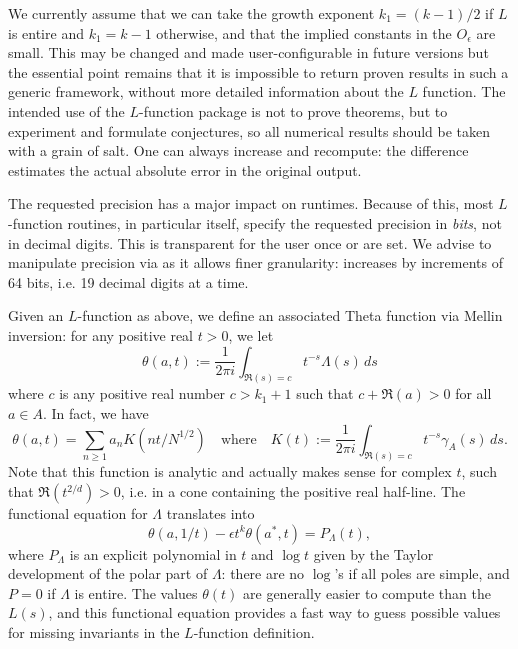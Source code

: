 We currently assume that we can take the growth exponent $k_1 = (k-1)/2$ if
$L$ is entire and $k_1 = k-1$ otherwise, and that the implied constants in
the $O_\epsilon$ are small. This may be changed and made user-configurable
in future versions but the essential point remains that it is impossible to
return proven results in such a generic framework, without more detailed
information about the $L$ function. The intended use of the $L$-function
package is not to prove theorems, but to experiment and formulate
conjectures, so all numerical results should be taken with a grain of salt.
One can always increase  and recompute: the difference
estimates the actual absolute error in the original output.

 The requested precision has a major impact on runtimes.
Because of this, most $L$-function routines, in particular  itself,
specify the requested precision in \emph{bits}, not in decimal digits.
This is transparent for the user once  or
 are set. We advise to manipulate precision via
 as it allows finer granularity: 
increases by increments of 64 bits, i.e. 19 decimal digits at a time.


Given an $L$-function as above, we define an associated Theta function
via Mellin inversion: for any positive real $t > 0$, we let
$$ \theta(a,t) := \dfrac{1}{2\pi i}\int_{\Re(s) = c} t^{-s} \Lambda(s)\, ds $$
where $c$ is any positive real number $c > k_1+1$ such that $c + \Re(a) > 0$
for all $a\in A$. In fact, we have
$$\theta(a,t) = \sum_{n\geq 1} a_n K(nt/N^{1/2})
\quad\text{where}\quad
K(t) := \dfrac{1}{2\pi i}\int_{\Re(s) = c} t^{-s} \gamma_A(s)\, ds.$$
Note that this function is analytic and actually makes sense for complex $t$,
such that $\Re(t^{2/d}) > 0$, i.e. in a cone containing the positive real
half-line. The functional equation for $\Lambda$ translates into
$$ \theta(a,1/t) - \epsilon t^k\theta(a^*,t) = P_\Lambda(t), $$
where $P_\Lambda$ is an explicit polynomial in $t$ and $\log t$ given by the
Taylor development of the polar part of $\Lambda$: there are no $\log$'s if
all poles are simple, and $P = 0$ if $\Lambda$ is entire. The values
$\theta(t)$ are generally easier to compute than the $L(s)$, and this
functional equation provides a fast way to guess possible values for
missing invariants in the $L$-function definition.

